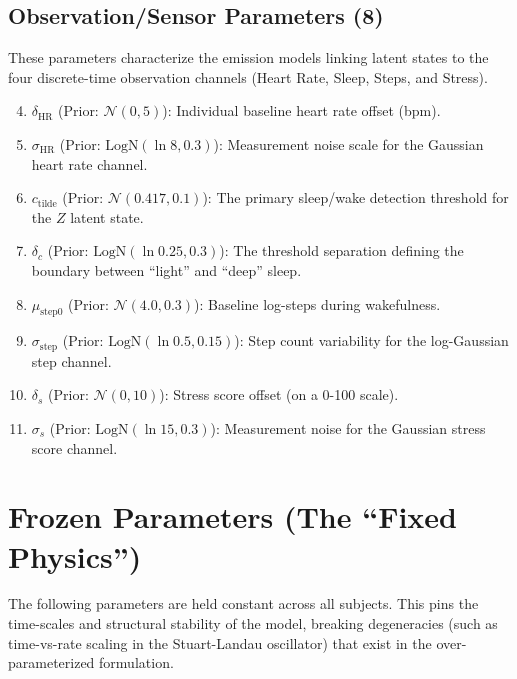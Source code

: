 \documentclass[11pt,a4paper]{article}
\begin{document}
\subsection{Observation/Sensor Parameters (8)}
These parameters characterize the emission models linking latent states to the four discrete-time observation channels (Heart Rate, Sleep, Steps, and Stress).
\begin{enumerate}
\setcounter{enumi}{3}
    \item $\delta_{\text{HR}}$ (Prior: $\mathcal{N}(0, 5)$): Individual baseline heart rate offset (bpm).
    \item $\sigma_{\text{HR}}$ (Prior: $\text{LogN}(\ln 8, 0.3)$): Measurement noise scale for the Gaussian heart rate channel.
    \item $c_{\text{tilde}}$ (Prior: $\mathcal{N}(0.417, 0.1)$): The primary sleep/wake detection threshold for the $Z$ latent state.
    \item $\delta_c$ (Prior: $\text{LogN}(\ln 0.25, 0.3)$): The threshold separation defining the boundary between ``light'' and ``deep'' sleep.
    \item $\mu_{\text{step}0}$ (Prior: $\mathcal{N}(4.0, 0.3)$): Baseline log-steps during wakefulness.
    \item $\sigma_{\text{step}}$ (Prior: $\text{LogN}(\ln 0.5, 0.15)$): Step count variability for the log-Gaussian step channel.
    \item $\delta_s$ (Prior: $\mathcal{N}(0, 10)$): Stress score offset (on a 0-100 scale).
    \item $\sigma_s$ (Prior: $\text{LogN}(\ln 15, 0.3)$): Measurement noise for the Gaussian stress score channel.
\end{enumerate}

\section{Frozen Parameters (The ``Fixed Physics'')}

The following parameters are held constant across all subjects. This pins the time-scales and structural stability of the model, breaking degeneracies (such as time-vs-rate scaling in the Stuart-Landau oscillator) that exist in the over-parameterized formulation.
\end{document}
